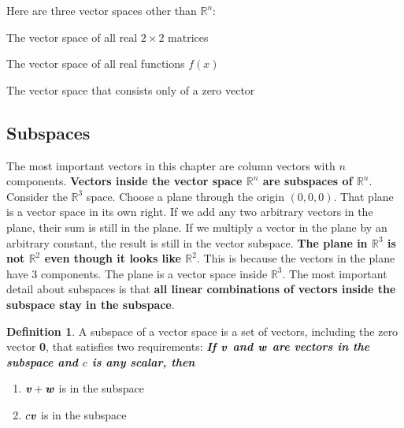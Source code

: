 \documentclass[12pt, letterpaper]{article}
\newcommand{\R}[1]{$\mathbb{R}^{#1}$}
\newcommand{\V}[1]{\textbf{\textit{#1}}}
\newcommand{\DefinitionSpace}{\vspace{15px}}
\theoremstyle{definition}
\newtheorem{definition}{Definition}[section]
\begin{document}
				\noindent Here are three vector spaces other than \R{n}:
			\begin{description}[labelindent=2\parindent]
				\item[$\mathbb{M}$] The vector space of all real $2\times2$ matrices
				\item[$\mathbb{F}$] The vector space of all real functions $f(x)$
				\item[$\mathbb{Z}$] The vector space that consists only of a zero vector
			\end{description}
			
				
\subsection{Subspaces}
	The most important vectors in this chapter are column vectors with $n$ components. \textbf{Vectors inside the vector space \R{n} are subspaces of \R{n}}. Consider the \R{3} space. Choose a plane through the origin $(0,0,0)$. That plane is a vector space in its own right. If we add any two arbitrary vectors in the plane, their sum is still in the plane. If we multiply a vector in the plane by an arbitrary constant, the result is still in the vector subspace. \textbf{The plane in \R{3} is not \R{2} even though it looks like \R{2}}. This is because the vectors in the plane have 3 components. The plane is a vector space inside \R{3}. The most important detail about subspaces is that \textbf{all linear combinations of vectors inside the subspace stay in the subspace}. 
		
		\DefinitionSpace
			\begin{definition}
				A subspace of a vector space is a set of vectors, including the zero vector \textbf{0}, that satisfies two requirements: \textbf{\textit{If $\V{v}$ and $\V{w}$ are vectors in the subspace and $c$ is any scalar, then}}
				
				\renewcommand{\theenumi}{\roman{enumi}}
				\begin{enumerate}[leftmargin=2\parindent]
					\item $\V{v}+\V{w}$ is in the subspace
					\item $c\V{v}$ is in the subspace
				\end{enumerate}	
			\end{definition} 	
		\DefinitionSpace
	
\end{document}
